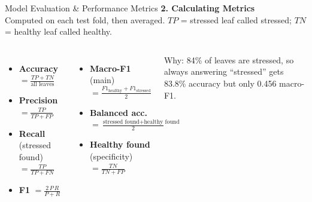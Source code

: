 \documentclass[aspectratio=169, 11pt]{beamer}
\begin{document}
\begin{frame}{Model Evaluation \& Performance Metrics}
    \vspace{0.15cm}
    {\normalsize\bfseries 2. Calculating Metrics}\\[2pt]
    {\scriptsize Computed on each test fold, then averaged. $TP$ = stressed leaf called stressed; $TN$ = healthy leaf called healthy.}
    \vspace{0.05cm}
    \begin{columns}[T, onlytextwidth]
        \begin{itemize}\scriptsize
            \setlength{\itemsep}{1pt}
            \item \textbf{Accuracy} $= \frac{TP+TN}{\text{all leaves}}$
            \item \textbf{Precision} $= \frac{TP}{TP+FP}$
            \item \textbf{Recall} (stressed found) $= \frac{TP}{TP+FN}$
            \item \textbf{F1} $= \frac{2\,P\,R}{P+R}$
        \end{itemize}
        \begin{itemize}\scriptsize
            \setlength{\itemsep}{1pt}
            \item \textbf{\textcolor{amritaMaroon}{Macro-F1}} (main) $= \frac{F1_{\text{healthy}} + F1_{\text{stressed}}}{2}$
            \item \textbf{Balanced acc.} $= \frac{\text{stressed found} + \text{healthy found}}{2}$
            \item \textbf{Healthy found} (specificity) $= \frac{TN}{TN+FP}$
        \end{itemize}
        {\tiny Why: 84\% of leaves are stressed, so always answering ``stressed'' gets 83.8\% accuracy but only 0.456 macro-F1.}
    \end{columns}
\end{frame}

\end{document}
